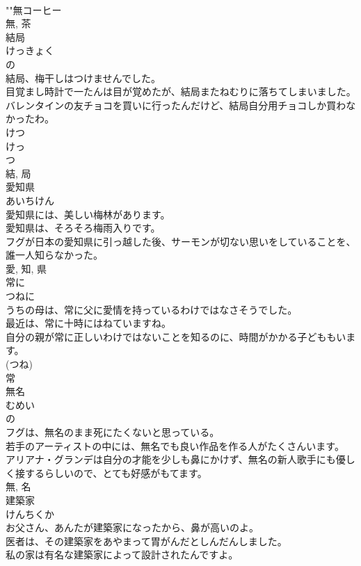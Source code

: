 \documentclass[8pt]{extreport}
\begin{document}
\begin{CJK}{UTF8}{min}
\\	""無コーヒー
\\	無, 茶	
\\	結局	
\\	けっきょく	
\\	の 
\\	結局、梅干しはつけませんでした。	
\\	目覚まし時計で一たんは目が覚めたが、結局またねむりに落ちてしまいました。	
\\	バレンタインの友チョコを買いに行ったんだけど、結局自分用チョコしか買わなかったわ。	
\\	けつ 
\\	けっ 
\\	つ
\\	結, 局	
\\	愛知県	
\\	あいちけん	
\\	愛知県には、美しい梅林があります。	
\\	愛知県は、そろそろ梅雨入りです。	
\\	フグが日本の愛知県に引っ越した後、サーモンが切ない思いをしていることを、誰一人知らなかった。	
\\	愛, 知, 県	
\\	常に	
\\	つねに	
\\	うちの母は、常に父に愛情を持っているわけではなさそうでした。	
\\	最近は、常に十時にはねていますね。	
\\	自分の親が常に正しいわけではないことを知るのに、時間がかかる子どももいます。	
\\	(つね) 
\\	常	
\\	無名	
\\	むめい	
\\	の 
\\	フグは、無名のまま死にたくないと思っている。	
\\	若手のアーティストの中には、無名でも良い作品を作る人がたくさんいます。	
\\	アリアナ・グランデは自分の才能を少しも鼻にかけず、無名の新人歌手にも優しく接するらしいので、とても好感がもてます。	
\\	無, 名	
\\	建築家	
\\	けんちくか	
\\	お父さん、あんたが建築家になったから、鼻が高いのよ。	
\\	医者は、その建築家をあやまって胃がんだとしんだんしました。	
\\	私の家は有名な建築家によって設計されたんですよ。	

\end{CJK}
\end{document}
